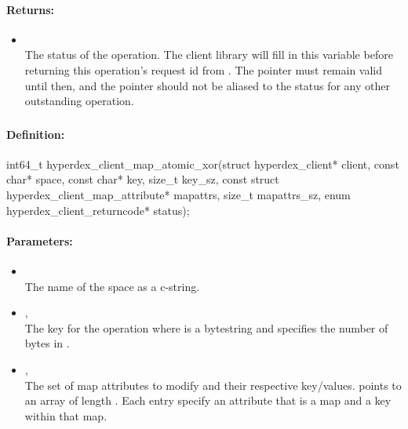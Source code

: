 \paragraph{Returns:}
\begin{itemize}[noitemsep]
\item {}\\
The status of the operation.  The client library will fill in this variable before returning this operation's request id from .  The pointer must remain valid until then, and the pointer should not be aliased to the status for any other outstanding operation.
\end{itemize}

\pagebreak
\subsubsection{}
\label{api:c:map_atomic_xor}


\paragraph{Definition:}
\begin{ccode}
int64_t hyperdex_client_map_atomic_xor(struct hyperdex_client* client,
        const char* space,
        const char* key, size_t key_sz,
        const struct hyperdex_client_map_attribute* mapattrs, size_t mapattrs_sz,
        enum hyperdex_client_returncode* status);
\end{ccode}

\paragraph{Parameters:}
\begin{itemize}[noitemsep]
\item {}\\
The name of the space as a c-string.
\item {}, \\
The key for the operation where  is a bytestring and  specifies the number of bytes in .
\item {}, \\
The set of map attributes to modify and their respective key/values.   points to an array of length .  Each entry specify an attribute that is a map and a key within that map.
\end{itemize}

